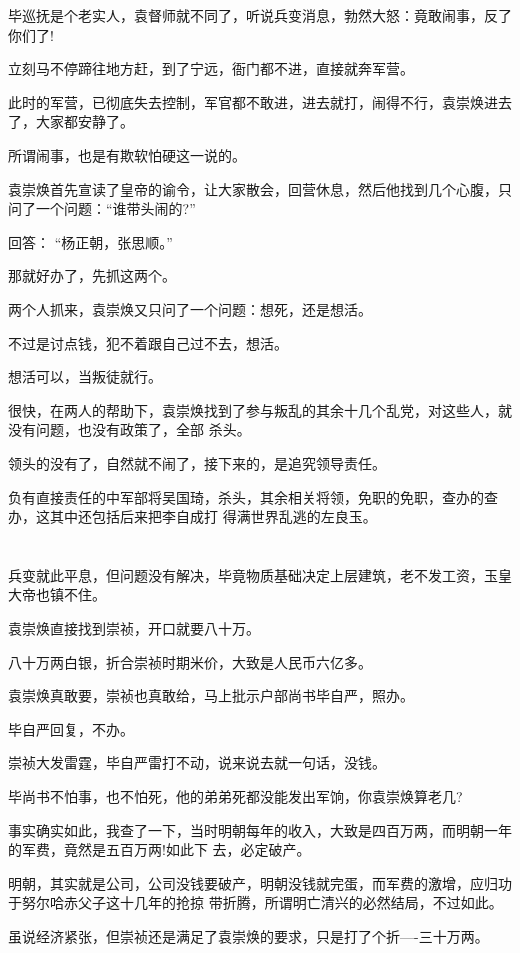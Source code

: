 \documentclass[11pt,a4paper,onecolumn]{article}
\begin{document}
毕巡抚是个老实人，袁督师就不同了，听说兵变消息，勃然大怒：竟敢闹事，反了你们了!

立刻马不停蹄往地方赶，到了宁远，衙门都不进，直接就奔军营。

此时的军营，已彻底失去控制，军官都不敢进，进去就打，闹得不行，袁崇焕进去了，大家都安静了。

所谓闹事，也是有欺软怕硬这一说的。

袁崇焕首先宣读了皇帝的谕令，让大家散会，回营休息，然后他找到几个心腹，只问了一个问题：``谁带头闹的?''

回答： ``杨正朝，张思顺。''

那就好办了，先抓这两个。

两个人抓来，袁崇焕又只问了一个问题：想死，还是想活。

不过是讨点钱，犯不着跟自己过不去，想活。

想活可以，当叛徒就行。

很快，在两人的帮助下，袁崇焕找到了参与叛乱的其余十几个乱党，对这些人，就没有问题，也没有政策了，全部
杀头。

领头的没有了，自然就不闹了，接下来的，是追究领导责任。

负有直接责任的中军部将吴国琦，杀头，其余相关将领，免职的免职，查办的查办，这其中还包括后来把李自成打
得满世界乱逃的左良玉。

\section[\thesection]{}

兵变就此平息，但问题没有解决，毕竟物质基础决定上层建筑，老不发工资，玉皇大帝也镇不住。

袁崇焕直接找到崇祯，开口就要八十万。

八十万两白银，折合崇祯时期米价，大致是人民币六亿多。

袁崇焕真敢要，崇祯也真敢给，马上批示户部尚书毕自严，照办。

毕自严回复，不办。

崇祯大发雷霆，毕自严雷打不动，说来说去就一句话，没钱。

毕尚书不怕事，也不怕死，他的弟弟死都没能发出军饷，你袁崇焕算老几?

事实确实如此，我查了一下，当时明朝每年的收入，大致是四百万两，而明朝一年的军费，竟然是五百万两!如此下
去，必定破产。

明朝，其实就是公司，公司没钱要破产，明朝没钱就完蛋，而军费的激增，应归功于努尔哈赤父子这十几年的抢掠
带折腾，所谓明亡清兴的必然结局，不过如此。

虽说经济紧张，但崇祯还是满足了袁崇焕的要求，只是打了个折----三十万两。
\end{document}
